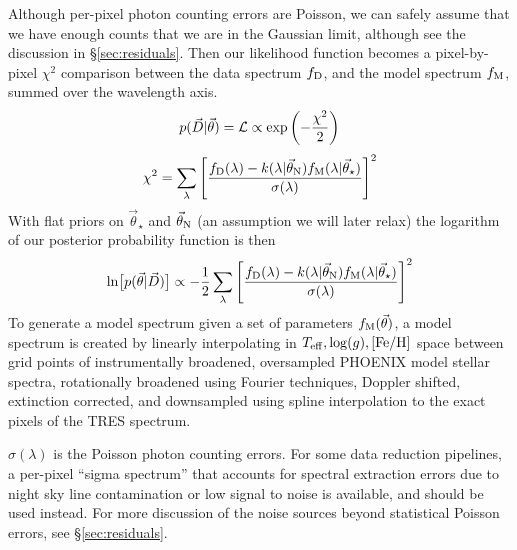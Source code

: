 \documentclass[preprint]{aastex} %
\newcommand{\vt}{\vec{\theta}}
\newcommand{\vstar}{\vt_{\star}}
\newcommand{\vN}{\vt_{\rm N}}
\newcommand{\fM}{f_{\rm M}}
\newcommand{\fD}{f_{\rm D}}
\newcommand{\vD}{\vec{D}}
\begin{document}
Although per-pixel photon counting errors are Poisson, we can safely assume that we have enough counts that we are in the Gaussian limit, although see the discussion in \S\ref{sec:residuals}. Then our likelihood function becomes a pixel-by-pixel $\chi^2$ comparison between the data spectrum $\fD$, and the model spectrum $\fM$, summed over the wavelength axis. 
\begin{equation}
 p(\vD | \vt) = {\cal L} \propto \exp \left(-\frac{\chi^2}{2} \right)
\end{equation}
\begin{equation}
  \chi^2 = \sum_\lambda \left [\frac{ \fD(\lambda) - k(\lambda | \vN) \fM(\lambda | \vstar) }{\sigma(\lambda)} \right ]^2
\end{equation}
With flat priors on $\vstar$ and $\vN$ (an assumption we will later relax) the logarithm of our posterior probability function is then
\begin{equation}
  \ln \bigl [p(\vt | \vD) \bigr] \propto - \frac{1}{2} \sum_\lambda \left [\frac{ \fD(\lambda) - k(\lambda | \vN) \fM(\lambda | \vstar) }{\sigma(\lambda)} \right ]^2
  \label{eqn:lnprob}
\end{equation}
To generate a model spectrum given a set of parameters $\fM(\vt)$, a model spectrum is created by linearly interpolating in $T_{\rm eff}, \log(g), [{\rm Fe}/{\rm H}]$ space between grid points of instrumentally broadened, oversampled PHOENIX model stellar spectra, rotationally broadened using Fourier techniques, Doppler shifted, extinction corrected, and downsampled using spline interpolation to the exact pixels of the TRES spectrum. 

$\sigma(\lambda)$ is the Poisson photon counting errors. For some data reduction pipelines, a per-pixel ``sigma spectrum'' that accounts for spectral extraction errors due to night sky line contamination or low signal to noise is available, and should be used instead. For more discussion of the noise sources beyond statistical Poisson errors, see \S\ref{sec:residuals}.
\end{document}
